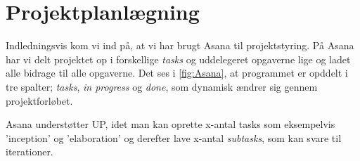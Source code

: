 \chapter{Projektplanlægning}

Indledningsvis kom vi ind på, at vi har brugt Asana til projektstyring.
På Asana har vi delt projektet op i forskellige \textit{tasks} og uddelegeret opgaverne lige og ladet alle bidrage til alle opgaverne.
Det ses i \ref{fig:Asana}, at programmet er opddelt i tre spalter; \textit{tasks}, \textit{in progress} og \textit{done}, som dynamisk ændrer sig gennem projektforløbet.

\noindent
Asana understøtter UP, idet man kan oprette x-antal tasks som eksempelvis 'inception' og 'elaboration' og derefter lave x-antal \textit{subtasks}, som kan svare til iterationer.

\pagebreak

